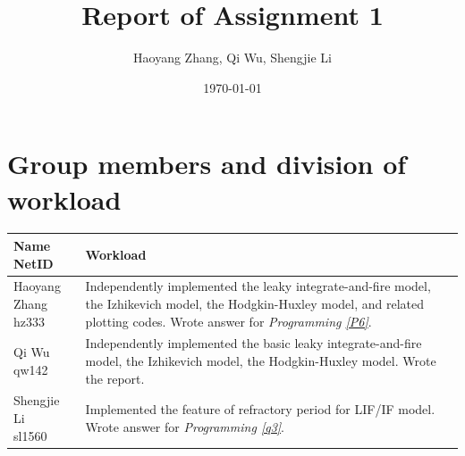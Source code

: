 \documentclass[11pt]{article}
\title{Report of Assignment 1}
\author{Haoyang Zhang, Qi Wu, Shengjie Li}
\begin{document}
\date{\today}
\maketitle

    \section*{Group members and division of workload}
    \begin{tabular}{| p{3cm} | p{\textwidth -4cm} |}
    	\hline
    	\makecell[c]{Name \\ NetID} & Workload \\
    	\hline
    	\makecell[c]{Haoyang Zhang \\ hz333} & {Independently implemented the leaky integrate-and-fire model, the Izhikevich model, the Hodgkin-Huxley model, and related plotting codes. Wrote answer for \textit{Programming \ref{P6}}.} \\
    	\hline
    	\makecell[c]{Qi Wu \\ qw142} & {Independently implemented the basic leaky integrate-and-fire model, the Izhikevich model, the Hodgkin-Huxley model. Wrote the report.} \\
    	\hline
    	\makecell[c]{Shengjie Li \\ sl1560} & {Implemented the feature of refractory period for LIF/IF model. Wrote answer for \textit{Programming \ref{q3}}.} \\
    	\hline
    \end{tabular}
\end{document}
